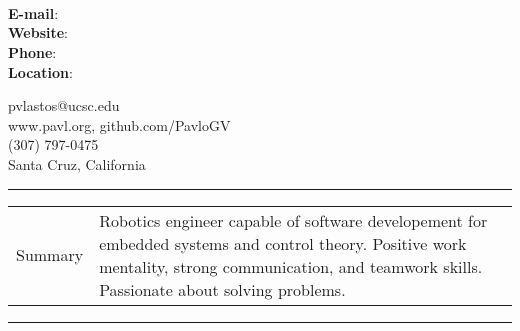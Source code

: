 \documentclass[paper=a4,fontsize=11pt]{article} %
\def \sectionSpace   {0.006\textheight} %
\def \leftColSpace      {0.1\textwidth} %
\def \restOfColSpace {0.85\textwidth}   %
\def \lineThickness {1pt}               %
\begin{document}
 

    \noindent
    \begin{minipage}[b]{0.6\textwidth}
    \noindent \\
    \noindent \\
    \noindent \\
    \end{minipage}
    \begin{minipage}[b]{0.1\textwidth}
    \noindent \textbf{E-mail}:\\
    \noindent \textbf{Website}:\\
    \noindent \textbf{Phone}:\\
    \noindent \textbf{Location}:
    \end{minipage}
    \begin{minipage}[b]{0.4\textwidth}
    \noindent pvlastos@ucsc.edu\\
    \noindent www.pavl.org, github.com/PavloGV\\
     (307) 797-0475\\
    \noindent Santa Cruz, California
    \end{minipage}
    \vspace{\sectionSpace}
    \noindent\rule{\textwidth}{\lineThickness}

    \begin{longtable}[l]{p{\leftColSpace} p{\restOfColSpace}}
        Summary & Robotics engineer capable of software developement for embedded systems and control theory. Positive work mentality, strong communication, and teamwork skills. Passionate about solving problems.\\
    \end{longtable}
    \vspace{\sectionSpace}
    \noindent\rule{\textwidth}{\lineThickness}

\end{document}

